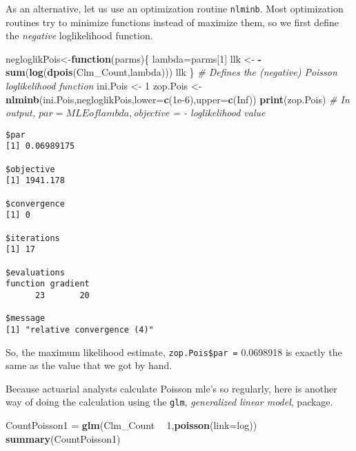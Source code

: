 \documentclass[]{book}
\newenvironment{Shaded}{\begin{snugshade}}{\end{snugshade}}
\newcommand{\KeywordTok}[1]{\textcolor[rgb]{0.13,0.29,0.53}{\textbf{#1}}}
\newcommand{\DataTypeTok}[1]{\textcolor[rgb]{0.13,0.29,0.53}{#1}}
\newcommand{\DecValTok}[1]{\textcolor[rgb]{0.00,0.00,0.81}{#1}}
\newcommand{\FloatTok}[1]{\textcolor[rgb]{0.00,0.00,0.81}{#1}}
\newcommand{\StringTok}[1]{\textcolor[rgb]{0.31,0.60,0.02}{#1}}
\newcommand{\CommentTok}[1]{\textcolor[rgb]{0.56,0.35,0.01}{\textit{#1}}}
\newcommand{\OtherTok}[1]{\textcolor[rgb]{0.56,0.35,0.01}{#1}}
\newcommand{\ControlFlowTok}[1]{\textcolor[rgb]{0.13,0.29,0.53}{\textbf{#1}}}
\newcommand{\OperatorTok}[1]{\textcolor[rgb]{0.81,0.36,0.00}{\textbf{#1}}}
\newcommand{\NormalTok}[1]{#1}
\theoremstyle{definition}
\theoremstyle{definition}
\theoremstyle{definition}
\theoremstyle{remark}
\begin{document}
As an alternative, let us use an optimization routine \texttt{nlminb}.
Most optimization routines try to minimize functions instead of maximize
them, so we first define the \emph{negative} loglikelihood function.

\begin{Shaded}
\begin{Highlighting}[]
\NormalTok{negloglikPois<-}\ControlFlowTok{function}\NormalTok{(parms)\{}
\NormalTok{  lambda=parms[}\DecValTok{1}\NormalTok{]}
\NormalTok{  llk <-}\StringTok{ }\OperatorTok{-}\KeywordTok{sum}\NormalTok{(}\KeywordTok{log}\NormalTok{(}\KeywordTok{dpois}\NormalTok{(Clm_Count,lambda)))}
\NormalTok{  llk}
\NormalTok{\} }\CommentTok{# Defines the (negative) Poisson loglikelihood function}
\NormalTok{ini.Pois <-}\StringTok{ }\DecValTok{1} 
\NormalTok{zop.Pois <-}\StringTok{ }\KeywordTok{nlminb}\NormalTok{(ini.Pois,negloglikPois,}\DataTypeTok{lower=}\KeywordTok{c}\NormalTok{(}\FloatTok{1e-6}\NormalTok{),}\DataTypeTok{upper=}\KeywordTok{c}\NormalTok{(}\OtherTok{Inf}\NormalTok{))}
\KeywordTok{print}\NormalTok{(zop.Pois) }\CommentTok{# In output, $par = MLE of lambda, $objective = - loglikelihood value}
\end{Highlighting}
\end{Shaded}

\begin{verbatim}
$par
[1] 0.06989175

$objective
[1] 1941.178

$convergence
[1] 0

$iterations
[1] 17

$evaluations
function gradient 
      23       20 

$message
[1] "relative convergence (4)"
\end{verbatim}

So, the maximum likelihood estimate, \texttt{zop.Pois\$par\ =} 0.0698918
is exactly the same as the value that we got by hand.

Because actuarial analysts calculate Poisson mle's so regularly, here is
another way of doing the calculation using the \texttt{glm},
\emph{generalized linear model}, package.

\begin{Shaded}
\begin{Highlighting}[]
\NormalTok{CountPoisson1 =}\StringTok{ }\KeywordTok{glm}\NormalTok{(Clm_Count }\OperatorTok{~}\StringTok{ }\DecValTok{1}\NormalTok{,}\KeywordTok{poisson}\NormalTok{(}\DataTypeTok{link=}\NormalTok{log))}
\KeywordTok{summary}\NormalTok{(CountPoisson1)}
\end{Highlighting}
\end{Shaded}
\end{document}
